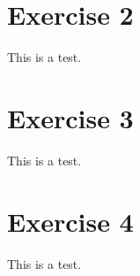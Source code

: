 \documentclass[10pt]{article}
\begin{document}
\newpage
\section{Exercise 2}

This is a test. 

\section{Exercise 3}

This is a test. 

\section{Exercise 4}

This is a test. 
\end{document}
